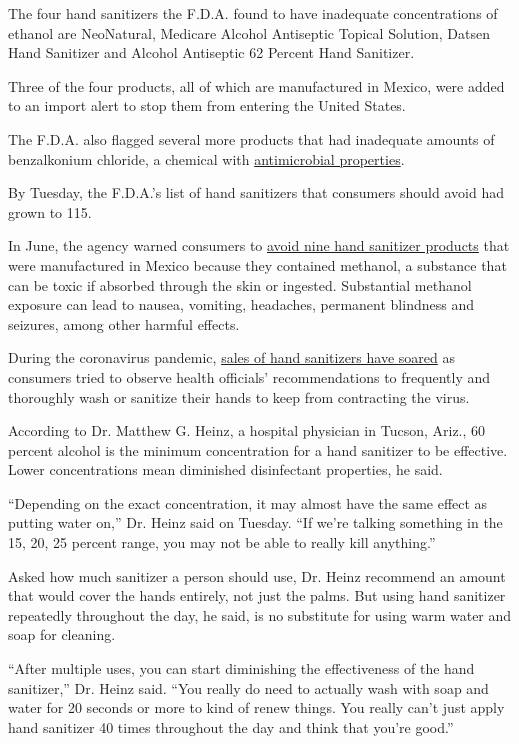The four hand sanitizers the F.D.A. found to have inadequate
concentrations of ethanol are NeoNatural, Medicare Alcohol Antiseptic
Topical Solution, Datsen Hand Sanitizer and Alcohol Antiseptic 62
Percent Hand Sanitizer.

Three of the four products, all of which are manufactured in Mexico,
were added to an import alert to stop them from entering the United
States.

The F.D.A. also flagged several more products that had inadequate
amounts of benzalkonium chloride, a chemical with
\href{https://www.ncbi.nlm.nih.gov/pmc/articles/PMC6581159/}{antimicrobial
properties}.

By Tuesday, the F.D.A.'s list of hand sanitizers that consumers should
avoid had grown to 115.

In June, the agency warned consumers to
\href{https://www.nytimes.com/2020/06/22/health/fda-Eskbiochem-toxic-hand-sanitizer-virus.html}{avoid
nine hand sanitizer products} that were manufactured in Mexico because
they contained methanol, a substance that can be toxic if absorbed
through the skin or ingested. Substantial methanol exposure can lead to
nausea, vomiting, headaches, permanent blindness and seizures, among
other harmful effects.

During the coronavirus pandemic,
\href{https://www.nytimes.com/2020/03/11/smarter-living/wirecutter/coronavirus-hand-sanitizer.html}{sales
of hand sanitizers have soared} as consumers tried to observe health
officials' recommendations to frequently and thoroughly wash or sanitize
their hands to keep from contracting the virus.

According to Dr. Matthew G. Heinz, a hospital physician in Tucson,
Ariz., 60 percent alcohol is the minimum concentration for a hand
sanitizer to be effective. Lower concentrations mean diminished
disinfectant properties, he said.

``Depending on the exact concentration, it may almost have the same
effect as putting water on,'' Dr. Heinz said on Tuesday. ``If we're
talking something in the 15, 20, 25 percent range, you may not be able
to really kill anything.''

Asked how much sanitizer a person should use, Dr. Heinz recommend an
amount that would cover the hands entirely, not just the palms. But
using hand sanitizer repeatedly throughout the day, he said, is no
substitute for using warm water and soap for cleaning.

``After multiple uses, you can start diminishing the effectiveness of
the hand sanitizer,'' Dr. Heinz said. ``You really do need to actually
wash with soap and water for 20 seconds or more to kind of renew things.
You really can't just apply hand sanitizer 40 times throughout the day
and think that you're good.''

